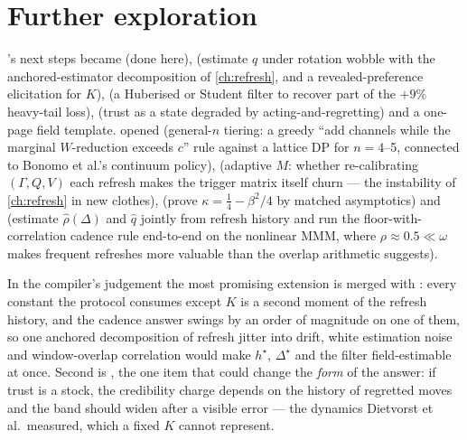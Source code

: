\section{Further exploration}

's next steps became  (done here),  (estimate $q$ under rotation wobble with the anchored-estimator decomposition of \cref{ch:refresh}, and a revealed-preference elicitation for $K$),  (a Huberised or Student filter to recover part of the $+9\%$ heavy-tail loss),  (trust as a state degraded by acting-and-regretting) and a one-page field template.  opened  (general-$n$ tiering: a greedy ``add channels while the marginal $W$-reduction exceeds $c$'' rule against a lattice DP for $n = 4$--5, connected to Bonomo et al.'s continuum policy),  (adaptive $M$: whether re-calibrating $(\Gamma, Q, V)$ each refresh makes the trigger matrix itself churn --- the instability of \cref{ch:refresh} in new clothes),  (prove $\kappa = \tfrac14 - \beta^2/4$ by matched asymptotics) and  (estimate $\hat\rho(\Delta)$ and $\hat q$ jointly from refresh history and run the floor-with-correlation cadence rule end-to-end on the nonlinear MMM, where $\rho \approx 0.5 \ll \omega$ makes frequent refreshes more valuable than the overlap arithmetic suggests).

In the compiler's judgement the most promising extension is  merged with : every constant the protocol consumes except $K$ is a second moment of the refresh history, and the cadence answer swings by an order of magnitude on one of them, so one anchored decomposition of refresh jitter into drift, white estimation noise and window-overlap correlation would make $h^\star$, $\Delta^\star$ and the filter field-estimable at once. Second is , the one item that could change the \emph{form} of the answer: if trust is a stock, the credibility charge depends on the history of regretted moves and the band should widen after a visible error --- the dynamics Dietvorst et al.\ measured, which a fixed $K$ cannot represent.


